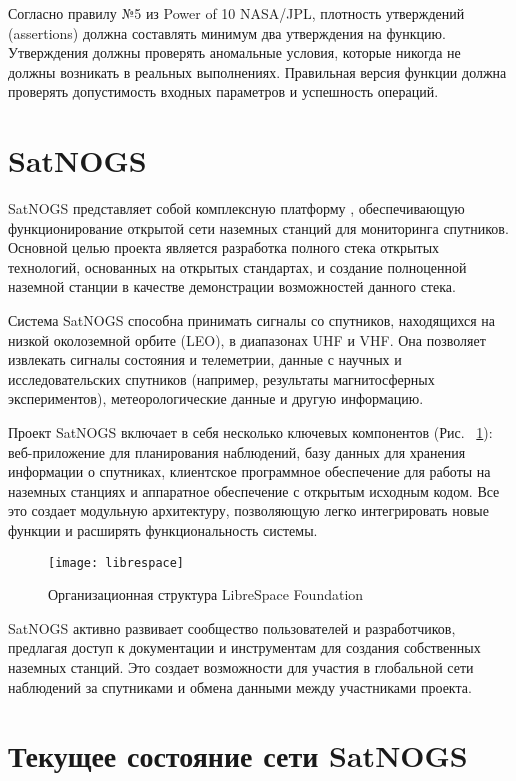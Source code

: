 Согласно правилу №5 из Power of 10 NASA/JPL, плотность утверждений (assertions) должна составлять минимум два утверждения на функцию\cite{opensourcesatellite}\cite{reddit_learnprogramming}. Утверждения должны проверять аномальные условия, которые никогда не должны возникать в реальных выполнениях. Правильная версия функции должна проверять допустимость входных параметров и успешность операций.


\section{SatNOGS}

SatNOGS представляет собой комплексную платформу \cite{satnogs_general_docs},
обеспечивающую функционирование открытой сети наземных станций для мониторинга
спутников. Основной целью проекта является разработка полного стека открытых
технологий, основанных на открытых стандартах, и создание полноценной наземной
станции в качестве демонстрации возможностей данного стека.

Система SatNOGS способна принимать сигналы со спутников, находящихся на низкой
околоземной орбите (LEO), в диапазонах UHF и VHF. Она позволяет извлекать
сигналы состояния и телеметрии, данные с научных и исследовательских спутников
(например, результаты магнитосферных экспериментов), метеорологические данные и
другую информацию.

Проект SatNOGS включает в себя несколько ключевых компонентов (Рис. ~\ref{fig:librespace}): веб-приложение
для планирования наблюдений, базу данных для хранения информации о спутниках,
клиентское программное обеспечение для работы на наземных станциях и аппаратное
обеспечение с открытым исходным кодом. Все это создает модульную архитектуру,
позволяющую легко интегрировать новые функции и расширять функциональность
системы.

\begin{figure}[ht]
	\centering
	\texttt{[image: librespace]}
	\caption{Организационная структура LibreSpace Foundation}
	\label{fig:librespace}
\end{figure}

SatNOGS активно развивает сообщество пользователей и разработчиков, предлагая
доступ к документации и инструментам для создания собственных наземных станций.
Это создает возможности для участия в глобальной сети наблюдений за спутниками
и обмена данными между участниками проекта.

\section{Текущее состояние сети SatNOGS}

